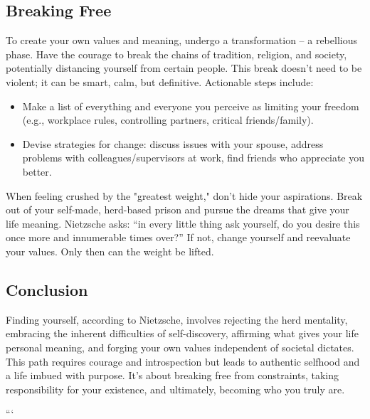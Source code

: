 \subsection*{Breaking Free}
To create your own values and meaning, undergo a transformation – a rebellious phase. Have the courage to break the chains of tradition, religion, and society, potentially distancing yourself from certain people. This break doesn't need to be violent; it can be smart, calm, but definitive.
Actionable steps include:
\begin{itemize}
    \item Make a list of everything and everyone you perceive as limiting your freedom (e.g., workplace rules, controlling partners, critical friends/family).
    \item Devise strategies for change: discuss issues with your spouse, address problems with colleagues/supervisors at work, find friends who appreciate you better.
\end{itemize}
When feeling crushed by the "greatest weight," don't hide your aspirations. Break out of your self-made, herd-based prison and pursue the dreams that give your life meaning. Nietzsche asks: “in every little thing ask yourself, do you desire this once more and innumerable times over?” If not, change yourself and reevaluate your values. Only then can the weight be lifted.

\subsection*{Conclusion}
Finding yourself, according to Nietzsche, involves rejecting the herd mentality, embracing the inherent difficulties of self-discovery, affirming what gives your life personal meaning, and forging your own values independent of societal dictates. This path requires courage and introspection but leads to authentic selfhood and a life imbued with purpose. It's about breaking free from constraints, taking responsibility for your existence, and ultimately, becoming who you truly are.


```